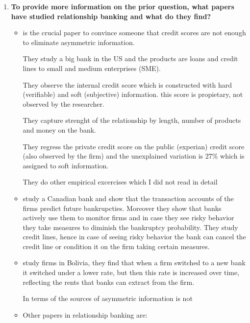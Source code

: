 \documentclass[12pt]{article}
\theoremstyle{plain}
\theoremstyle{plain}
\theoremstyle{definition}  %
\theoremstyle{remark}  %
\begin{document}
\begin{enumerate}
    \item \textbf{To provide more information on the prior question, what papers have studied relationship banking and what do they find? }
    
    \begin{itemize}
    
        \item \textcite{agarwal_distance_2010} is the crucial paper to convince someone that credit scores are not enough to eliminate asymmetric information. 

        They study a big bank in the US and the products are loans and credit lines to small and medium enterprises (SME). 

        They observe the internal credit score which is constructed with hard (verifiable) and soft (subjective) information. this score is propietary, not observed by the researcher.

        They capture strenght of the relationship by length, number of products and money on the bank.

        They regress the private credit score on the public (experian) credit score (also observed by the firm) and the unexplained variation is 27\% which is assigned to soft information.

        They do other empirical excercises which I did not read in detail

        
        \item \textcite{mester_transactions_2007} study a Canadian bank and show that the transaction accounts of the firms predict future bankrupcties. Moreover they show that banks actively use them to monitor firms and in case they see risky behavior they take measures to diminish the bankruptcy probability. They study credit lines, hence in case of seeing risky behavior the bank can cancel the credit line or condition it on the firm taking certain measures. 

        \item \textcite{ioannidou_time_2010} study firms in Bolivia, they find that when a firm switched to a new bank it switched under a lower rate, but then this rate is increased over time, reflecting the rents that banks can extract from the firm. 

        In terms of the sources of asymmetric information is not

        \item Other papers in relationship banking are: \textcite{bharath_lending_2011}


\end{itemize}
\end{enumerate}
\end{document}

